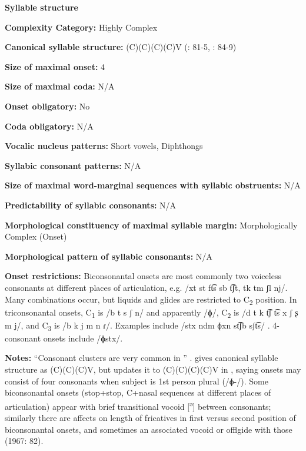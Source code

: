\textbf{Syllable structure}



\textbf{Complexity Category:} Highly Complex



\textbf{Canonical syllable structure:} (C)(C)(C)(C)V (\citealt{Howard1967}: 81-5, \citealt{Howard1972}: 84-9)



\textbf{Size of maximal onset:} 4



\textbf{Size of maximal coda:} N/A



\textbf{Onset obligatory:} No



\textbf{Coda obligatory:} N/A



\textbf{Vocalic nucleus patterns:} Short vowels, Diphthongs



\textbf{Syllabic consonant patterns:} N/A



\textbf{Size of maximal word{}-marginal sequences with syllabic obstruents:} N/A



\textbf{Predictability of syllabic consonants:} N/A



\textbf{Morphological constituency of maximal syllable margin:} Morphologically Complex (Onset)



\textbf{Morphological pattern of syllabic consonants:} N/A



\textbf{Onset restrictions:} Biconsonantal onsets are most commonly two voiceless consonants at different places of articulation, e.g. /xt st ft͡s sb t͡ʃt, tk tm ʃl nj/. Many combinations occur, but liquids and glides are restricted to C\textsubscript{2} position. In triconsonantal onsets, C\textsubscript{1} is /b t s ʃ n/ and apparently /ɸ/, C\textsubscript{2} is /d t k t͡ʃ t͡s x ʃ ʂ m j/, and C\textsubscript{3} is /b k j m n ɾ/. Examples include /stx ndm ɸxn st͡ʃb sʃt͡s/ . 4-consonant onsets include /ɸstx/.



\textbf{Notes:} “Consonant clusters are very common in ” \citep[81]{Howard1967}. \citet{Howard1967} gives canonical syllable structure as (C)(C)(C)V, but updates it to (C)(C)(C)(C)V in \citet{Howard1972}, saying onsets may consist of four consonants when subject is 1st person plural (/ɸ{}-/). Some biconsonantal onsets (stop+stop, C+nasal sequences at different places of articulation) appear with brief transitional vocoid [\textsuperscript{ə}] between consonants; similarly there are affects on length of fricatives in first versus second position of biconsonantal onsets, and sometimes an associated vocoid or offlgide with those (1967: 82).



